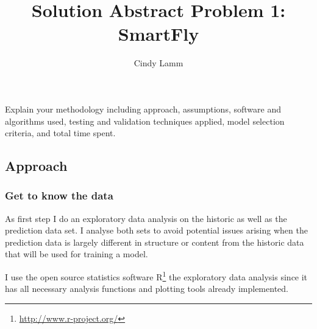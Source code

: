 \documentclass[12pt,a4paper]{article}
\author{Cindy Lamm}
\title{Solution Abstract Problem 1: SmartFly}
\begin{document}
\maketitle

Explain your methodology including approach, assumptions, software and algorithms used, testing and validation techniques applied, model selection criteria, and total time spent.

\subsection{Approach}

\subsubsection{Get to know the data}

As first step I do an exploratory data analysis on the historic as well as the prediction data set. I analyse both sets to avoid potential issues arising when the prediction data is largely different in structure or content from the historic data that will be used for training a model. 

I use the open source statistics software R\footnote{\url{http://www.r-project.org/}} the exploratory data analysis since it has all necessary analysis functions and plotting tools already implemented.
\end{document}
